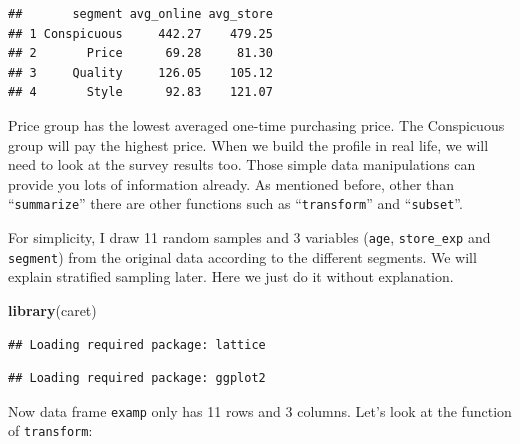 \documentclass[]{book}
\newenvironment{Shaded}{\begin{snugshade}}{\end{snugshade}}
\newcommand{\KeywordTok}[1]{\textcolor[rgb]{0.13,0.29,0.53}{\textbf{{#1}}}}
\newcommand{\DataTypeTok}[1]{\textcolor[rgb]{0.13,0.29,0.53}{{#1}}}
\newcommand{\DecValTok}[1]{\textcolor[rgb]{0.00,0.00,0.81}{{#1}}}
\newcommand{\FloatTok}[1]{\textcolor[rgb]{0.00,0.00,0.81}{{#1}}}
\newcommand{\StringTok}[1]{\textcolor[rgb]{0.31,0.60,0.02}{{#1}}}
\newcommand{\NormalTok}[1]{{#1}}
\theoremstyle{definition}
\theoremstyle{definition}
\theoremstyle{remark}
\begin{document}
\begin{verbatim}
##       segment avg_online avg_store
## 1 Conspicuous     442.27    479.25
## 2       Price      69.28     81.30
## 3     Quality     126.05    105.12
## 4       Style      92.83    121.07
\end{verbatim}

Price group has the lowest averaged one-time purchasing price. The
Conspicuous group will pay the highest price. When we build the profile
in real life, we will need to look at the survey results too. Those
simple data manipulations can provide you lots of information already.
As mentioned before, other than ``\texttt{summarize}'' there are other
functions such as ``\texttt{transform}'' and ``\texttt{subset}''.

For simplicity, I draw 11 random samples and 3 variables (\texttt{age},
\texttt{store\_exp} and \texttt{segment}) from the original data
according to the different segments. We will explain stratified sampling
later. Here we just do it without explanation.

\begin{Shaded}
\begin{Highlighting}[]
\KeywordTok{library}\NormalTok{(caret)}
\end{Highlighting}
\end{Shaded}

\begin{verbatim}
## Loading required package: lattice
\end{verbatim}

\begin{verbatim}
## Loading required package: ggplot2
\end{verbatim}

\begin{Shaded}
\end{Shaded}

Now data frame \texttt{examp} only has 11 rows and 3 columns. Let's look
at the function of \texttt{transform}:
\end{document}

